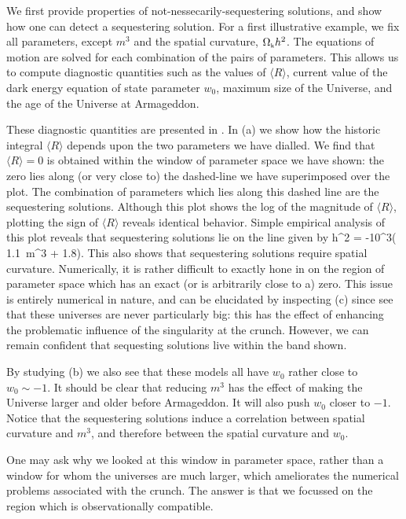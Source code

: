 \documentclass[amsmath,amssymb,10pt,twocolumn,eqsecnum]{revtex4}
\begin{document}
We first provide properties of not-nessecarily-sequestering solutions, and show how one can detect a sequestering solution. For a first illustrative example, we fix all parameters, except $m^3$ and the spatial curvature, ${\Omega}_{\scriptscriptstyle{\textrm{k}}}h^2$. The equations of motion are solved for each combination of the pairs of parameters. This allows us to compute diagnostic quantities such as the values of $\langle R\rangle$, current value of the dark energy equation of state parameter $w_0$, maximum size of the Universe, and the age of the Universe at Armageddon.

These diagnostic quantities are presented in . In (a) we show how the historic integral $\langle R\rangle$ depends upon the two parameters we have dialled. We find that $\langle R\rangle=0$ is obtained within the window of parameter space we have shown: the zero lies along (or very close to) the dashed-line we have superimposed over the plot. The combination of parameters which lies along this dashed line  are the sequestering solutions. Although this plot shows the log of the magnitude of $\langle R\rangle$, plotting the sign of $\langle R\rangle$ reveals identical behavior. Simple empirical analysis of this plot reveals that sequestering solutions lie on the line given by
\bea
{}h^2 = -10^3\left( 1.1\, m^3 + 1.8\right).
\eea
This also shows that sequestering solutions require spatial curvature. Numerically, it is rather difficult to exactly hone in on the region of parameter space which has an exact (or is arbitrarily close to a) zero. This issue is entirely numerical in nature, and can be elucidated by inspecting (c) since see that  these universes are never particularly big: this has the effect of enhancing the problematic influence of the singularity at the crunch. However, we can remain confident that sequesting solutions live within the band shown. 

By studying (b) we also see that these models all have $w_0$ rather close to $w_0 \sim -1$. It should be clear that reducing $m^3$ has the effect of making the Universe larger and older before Armageddon. It will also push $w_0$ closer to $-1$. Notice that the sequestering solutions induce a correlation between spatial curvature and $m^3$, and therefore between the spatial curvature and $w_0$.

One   may ask why we looked at this window in parameter space, rather than a window for whom the universes are much larger, which ameliorates the numerical problems associated with the crunch. The answer is that we focussed on the region which is observationally compatible.   
 
\end{document}
